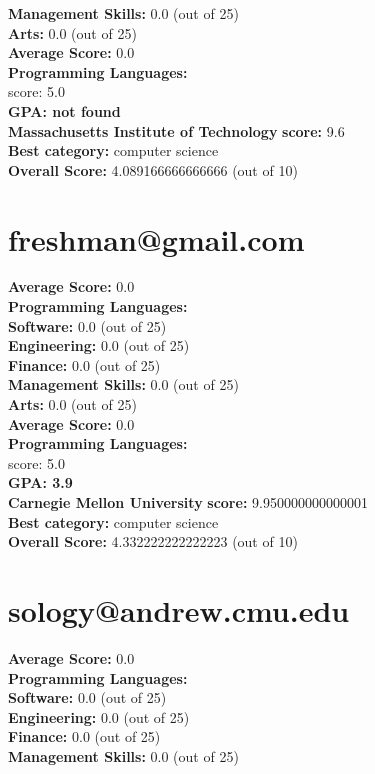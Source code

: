 \documentclass{article}
\begin{document}
    \textbf{Management Skills:} 0.0 (out of 25)\\
    \textbf{Arts:} 0.0 (out of 25)\\
\textbf{Average Score: } 0.0\\
\textbf{Programming Languages:} \\
score: 5.0\\
\textbf{GPA: not found}\\
\textbf{Massachusetts Institute of Technology} \textbf{score:} 9.6\\
\textbf{Best category: } computer science\\
    \textbf{Overall Score: }4.089166666666666 (out of 10)\section{freshman@gmail.com}
\textbf{Average Score: } 0.0\\
\textbf{Programming Languages:} \\
\textbf{Software:} 0.0 (out of 25)\\
    \textbf{Engineering: } 0.0 (out of 25)\\
    \textbf{Finance:} 0.0 (out of 25)\\
    \textbf{Management Skills:} 0.0 (out of 25)\\
    \textbf{Arts:} 0.0 (out of 25)\\
\textbf{Average Score: } 0.0\\
\textbf{Programming Languages:} \\
score: 5.0\\
\textbf{GPA: 3.9}\\
\textbf{Carnegie Mellon University} \textbf{score:} 9.950000000000001\\
\textbf{Best category: } computer science\\
    \textbf{Overall Score: }4.332222222222223 (out of 10)\section{sology@andrew.cmu.edu}
\textbf{Average Score: } 0.0\\
\textbf{Programming Languages:} \\
\textbf{Software:} 0.0 (out of 25)\\
    \textbf{Engineering: } 0.0 (out of 25)\\
    \textbf{Finance:} 0.0 (out of 25)\\
    \textbf{Management Skills:} 0.0 (out of 25)\\
\end{document}
